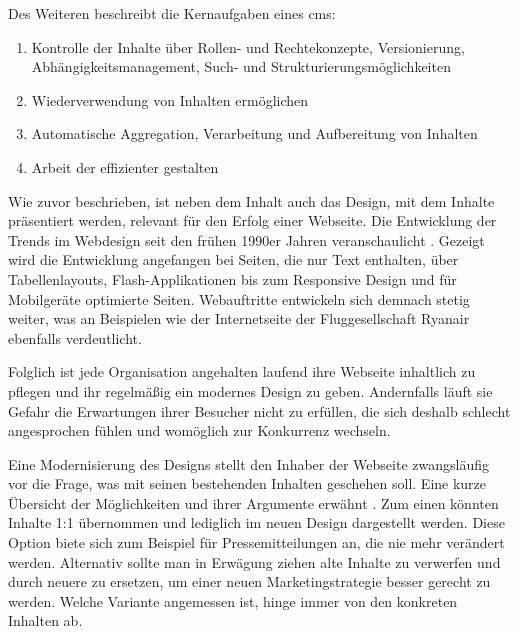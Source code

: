         Des Weiteren beschreibt \cite[][Seite 9-12]{barker:webCMS} die Kernaufgaben eines \gls{cms}:
        \begin{enumerate}
            \item   Kontrolle der Inhalte über Rollen- und Rechtekonzepte,
                    Versionierung, Abhängigkeitsmanagement, Such- und Strukturierungsmöglichkeiten
            \item   Wiederverwendung von Inhalten ermöglichen
            \item   Automatische Aggregation, Verarbeitung und Aufbereitung von Inhalten
            \item   Arbeit der \editors effizienter gestalten
        \end{enumerate}

        Wie zuvor beschrieben, ist neben dem Inhalt auch das Design,
        mit dem Inhalte präsentiert werden, relevant für den Erfolg einer Webseite.
        Die Entwicklung der Trends im Webdesign seit den frühen 1990er Jahren veranschaulicht
        \cite{work:webDesignEvolution}.
        Gezeigt wird die Entwicklung angefangen bei Seiten, die nur Text enthalten,
        über Tabellenlayouts, Flash-Applikationen bis zum Responsive Design und für
        Mobilgeräte optimierte Seiten.
        Webauftritte entwickeln sich demnach stetig weiter,
        was \cite{murphy:webDesignEvolution} an Beispielen wie der Internetseite der
        Fluggesellschaft Ryanair ebenfalls verdeutlicht.

        Folglich ist jede Organisation angehalten laufend ihre Webseite inhaltlich zu pflegen
        und ihr regelmäßig ein modernes Design zu geben.
        Andernfalls läuft sie Gefahr die Erwartungen ihrer Besucher nicht zu erfüllen,
        die sich deshalb schlecht angesprochen fühlen und womöglich zur Konkurrenz wechseln.

        Eine Modernisierung des Designs stellt den Inhaber der Webseite zwangsläufig vor die Frage,
        was mit seinen bestehenden Inhalten geschehen soll.
        Eine kurze Übersicht der Möglichkeiten und ihrer Argumente erwähnt \cite{kahl:contentMigration}.
        Zum einen könnten Inhalte 1:1 übernommen und lediglich im neuen Design dargestellt werden.
        Diese Option biete sich zum Beispiel für Pressemitteilungen an, die nie mehr verändert werden.
        Alternativ sollte man in Erwägung ziehen alte Inhalte zu verwerfen und durch neuere
        zu ersetzen, um einer neuen Marketingstrategie besser gerecht zu werden.
        Welche Variante angemessen ist, hinge immer von den konkreten Inhalten ab.

